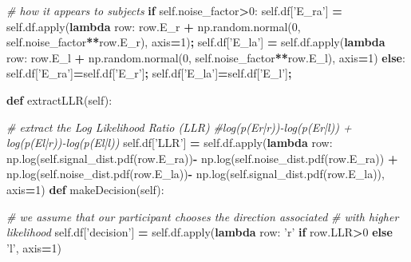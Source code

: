 \documentclass[12pt,twoside]{reedthesis}
\newenvironment{Shaded}{\begin{snugshade}}{\end{snugshade}}
\newcommand{\BuiltInTok}[1]{#1}
\newcommand{\CommentTok}[1]{\textcolor[rgb]{0.56,0.35,0.01}{\textit{#1}}}
\newcommand{\ControlFlowTok}[1]{\textcolor[rgb]{0.13,0.29,0.53}{\textbf{#1}}}
\newcommand{\DecValTok}[1]{\textcolor[rgb]{0.00,0.00,0.81}{#1}}
\newcommand{\KeywordTok}[1]{\textcolor[rgb]{0.13,0.29,0.53}{\textbf{#1}}}
\newcommand{\NormalTok}[1]{#1}
\newcommand{\OperatorTok}[1]{\textcolor[rgb]{0.81,0.36,0.00}{\textbf{#1}}}
\newcommand{\StringTok}[1]{\textcolor[rgb]{0.31,0.60,0.02}{#1}}
\newcommand{\VariableTok}[1]{\textcolor[rgb]{0.00,0.00,0.00}{#1}}
\begin{document}
\begin{Shaded}
\begin{Highlighting}[]
        \CommentTok{# how it appears to subjects}
        \ControlFlowTok{if} \VariableTok{self}\NormalTok{.noise_factor}\OperatorTok{>}\DecValTok{0}\NormalTok{:}
          \VariableTok{self}\NormalTok{.df[}\StringTok{'E_ra'}\NormalTok{] }\OperatorTok{=} \VariableTok{self}\NormalTok{.df.}\BuiltInTok{apply}\NormalTok{(}\KeywordTok{lambda}\NormalTok{ row: row.E_r }\OperatorTok{+}
\NormalTok{                 np.random.normal(}\DecValTok{0}\NormalTok{, }\VariableTok{self}\NormalTok{.noise_factor}\OperatorTok{**}\NormalTok{row.E_r), }
\NormalTok{                 axis}\OperatorTok{=}\DecValTok{1}\NormalTok{)}\OperatorTok{;}
          \VariableTok{self}\NormalTok{.df[}\StringTok{'E_la'}\NormalTok{] }\OperatorTok{=}  \VariableTok{self}\NormalTok{.df.}\BuiltInTok{apply}\NormalTok{(}\KeywordTok{lambda}\NormalTok{ row: row.E_l }\OperatorTok{+}
\NormalTok{                 np.random.normal(}\DecValTok{0}\NormalTok{, }\VariableTok{self}\NormalTok{.noise_factor}\OperatorTok{**}\NormalTok{row.E_l), }
\NormalTok{                 axis}\OperatorTok{=}\DecValTok{1}\NormalTok{)}
        \ControlFlowTok{else}\NormalTok{:}
          \VariableTok{self}\NormalTok{.df[}\StringTok{'E_ra'}\NormalTok{]}\OperatorTok{=}\VariableTok{self}\NormalTok{.df[}\StringTok{'E_r'}\NormalTok{]}\OperatorTok{;}
          \VariableTok{self}\NormalTok{.df[}\StringTok{'E_la'}\NormalTok{]}\OperatorTok{=}\VariableTok{self}\NormalTok{.df[}\StringTok{'E_l'}\NormalTok{]}\OperatorTok{;}
    
    \KeywordTok{def}\NormalTok{ extractLLR(}\VariableTok{self}\NormalTok{):}
        
        \CommentTok{# extract the Log Likelihood Ratio (LLR) }
        \CommentTok{#log(p(Er|r))-log(p(Er|l)) + log(p(El|r))-log(p(El|l))}
        \VariableTok{self}\NormalTok{.df[}\StringTok{'LLR'}\NormalTok{] }\OperatorTok{=} \VariableTok{self}\NormalTok{.df.}\BuiltInTok{apply}\NormalTok{(}\KeywordTok{lambda}\NormalTok{ row: }
\NormalTok{               np.log(}\VariableTok{self}\NormalTok{.signal_dist.pdf(row.E_ra))}\OperatorTok{-} 
\NormalTok{               np.log(}\VariableTok{self}\NormalTok{.noise_dist.pdf(row.E_ra)) }\OperatorTok{+} 
\NormalTok{               np.log(}\VariableTok{self}\NormalTok{.noise_dist.pdf(row.E_la))}\OperatorTok{-} 
\NormalTok{               np.log(}\VariableTok{self}\NormalTok{.signal_dist.pdf(row.E_la)), axis}\OperatorTok{=}\DecValTok{1}\NormalTok{)}
    \KeywordTok{def}\NormalTok{ makeDecision(}\VariableTok{self}\NormalTok{):}
        
        \CommentTok{# we assume that our participant chooses the direction associated }
        \CommentTok{# with higher likelihood}
        \VariableTok{self}\NormalTok{.df[}\StringTok{'decision'}\NormalTok{] }\OperatorTok{=}  \VariableTok{self}\NormalTok{.df.}\BuiltInTok{apply}\NormalTok{(}\KeywordTok{lambda}\NormalTok{ row: }
                                             \StringTok{'r'} \ControlFlowTok{if}\NormalTok{ row.LLR}\OperatorTok{>}\DecValTok{0} \ControlFlowTok{else} \StringTok{'l'}\NormalTok{, }
\NormalTok{                                             axis}\OperatorTok{=}\DecValTok{1}\NormalTok{)}
        

\end{Highlighting}
\end{Shaded}
\end{document}
